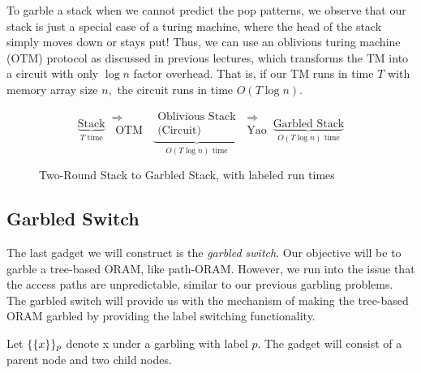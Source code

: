 To garble a stack when we cannot predict the pop patterns, we observe that our stack is just a special case of a turing machine, where the head of the stack simply moves down or stays put! 
Thus, we can use an oblivious turing machine (OTM) protocol as discussed in previous lectures, which transforms the TM into a circuit with only $\log n$ factor overhead. That is, if our TM runs in time $T$ with memory array size $n,$ the circuit runs in time $O(T\log n)$.
\begin{figure}
    \centering
    \[\underbrace{\text{Stack}}_{T \text{ time}} \, \substack{\Longrightarrow\\ \text{ OTM }} \, \underbrace{\substack{\text{Oblivious Stack}\\ \text{(Circuit)}}}_{O(T\log n) \text{ time}}  \, \substack{\Longrightarrow\\\text{Yao}} \, \underbrace{\text{Garbled Stack}}_{O(T\log n) \text{ time}}\]
    \caption{Two-Round Stack to Garbled Stack, with labeled run times}
    \label{fig:transform}
\end{figure}
\subsection{Garbled Switch}
The last gadget we will construct is the \textit{garbled switch}. 
Our objective will be to garble a tree-based ORAM, like path-ORAM.
However, we run into the issue that the access paths are unpredictable, similar to our previous garbling problems. 
The garbled switch will provide us with the mechanism of making the tree-based ORAM garbled by providing the label switching functionality.


Let $\{\{ x\}\}_p$ denote x under a garbling with label $p$.
The gadget will consist of a parent node and two child nodes.


